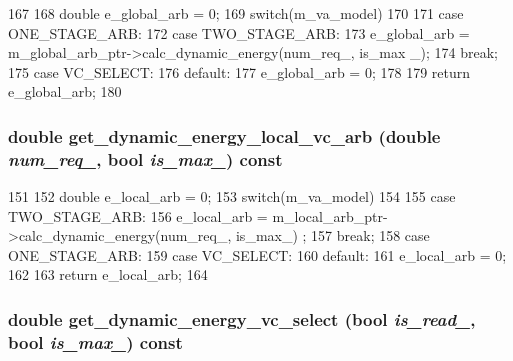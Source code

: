 \begin{DoxyCode}
167 {
168     double e_global_arb = 0;
169     switch(m_va_model)
170     {
171         case ONE_STAGE_ARB:
172         case TWO_STAGE_ARB:
173             e_global_arb = m_global_arb_ptr->calc_dynamic_energy(num_req_, is_max
      _);
174             break;
175         case VC_SELECT:
176         default:
177             e_global_arb = 0;
178     }
179     return e_global_arb;
180 }
\end{DoxyCode}
\hypertarget{classVCAllocator_aa89f985c9cd023b702cc81a72880abc9}{
\subsubsection[{get\_\-dynamic\_\-energy\_\-local\_\-vc\_\-arb}]{\setlength{\rightskip}{0pt plus 5cm}double get\_\-dynamic\_\-energy\_\-local\_\-vc\_\-arb (double {\em num\_\-req\_\-}, \/  bool {\em is\_\-max\_\-}) const}}
\label{classVCAllocator_aa89f985c9cd023b702cc81a72880abc9}



\begin{DoxyCode}
151 {
152     double e_local_arb = 0;
153     switch(m_va_model)
154     {
155         case TWO_STAGE_ARB:
156             e_local_arb = m_local_arb_ptr->calc_dynamic_energy(num_req_, is_max_)
      ;
157             break;
158         case ONE_STAGE_ARB:
159         case VC_SELECT:
160         default:
161             e_local_arb = 0;
162     }
163     return e_local_arb;
164 }
\end{DoxyCode}
\hypertarget{classVCAllocator_a6e17c2da843c6ed97d67718438367eb4}{
\subsubsection[{get\_\-dynamic\_\-energy\_\-vc\_\-select}]{\setlength{\rightskip}{0pt plus 5cm}double get\_\-dynamic\_\-energy\_\-vc\_\-select (bool {\em is\_\-read\_\-}, \/  bool {\em is\_\-max\_\-}) const}}
\label{classVCAllocator_a6e17c2da843c6ed97d67718438367eb4}



